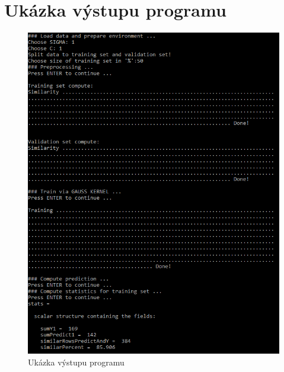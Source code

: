\documentclass[a4]{article}
\begin{document}
\section{Ukázka výstupu programu}
\begin{figure}[!ht]
	\centering
		\includegraphics[width=\textwidth]{images/output}
	\caption{Ukázka výstupu programu}
	\label{fig:output}
\end{figure}
\end{document}
